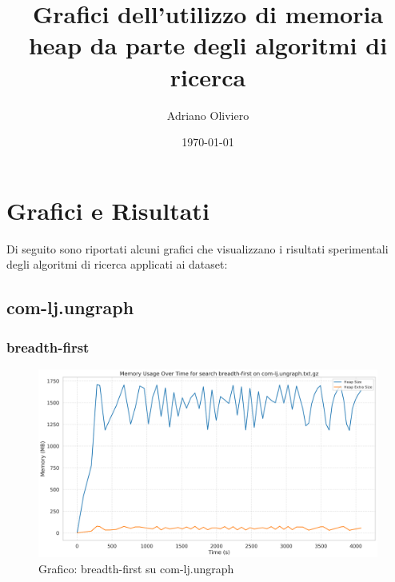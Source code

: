 \documentclass{article}
\title{Grafici dell'utilizzo di memoria heap da parte degli algoritmi di ricerca}
\author{Adriano Oliviero}
\date{\today}
\begin{document}
\maketitle

\tableofcontents

\section{Grafici e Risultati}
Di seguito sono riportati alcuni grafici che visualizzano i risultati sperimentali degli algoritmi di ricerca applicati ai dataset:

\subsection{com-lj.ungraph}
\subsubsection{breadth-first}
\begin{figure}[h]
	\centering
	\includegraphics[width=\textwidth]{../plots/com-lj.ungraph_breadth-first.png}
	\caption{Grafico: breadth-first su com-lj.ungraph}
\end{figure}
\end{document}
